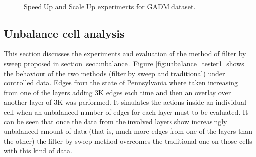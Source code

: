 \begin{figure}[!ht]
    \centering
     \\
    \caption{Speed Up and Scale Up experiments for GADM dataset.} \label{fig:gadm_speed_scale}
\end{figure}

\subsection{Unbalance cell analysis}

This section discusses the experiments and evaluation of the method of filter by sweep proposed in section \ref{sec:unbalance}. Figure \ref{fig:unbalance_tester1} shows the behaviour of the two methods (filter by sweep and traditional) under controlled data.  Edges from the state of Pennsylvania where taken increasing from one of the layers adding 3K edges each time and then an overlay over another layer of 3K was performed.  It simulates the actions inside an individual cell when an unbalanced number of edges for each layer must to be evaluated. It can be seen that once the data from the involved layers show increasingly unbalanced amount of data (that is, much more edges from one of the layers than the other) the filter by sweep method overcomes the traditional one on those cells with this kind of data.

